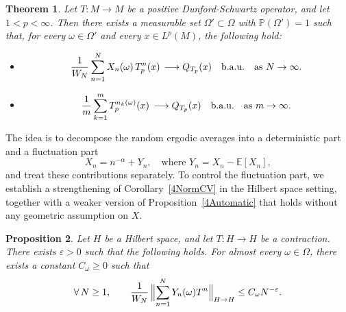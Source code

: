 \documentclass[12pt]{amsart}
\newcommand{\Pdb}{\mbox{$\mathbb{P}$}}
\newcommand{\Bignorm}[1]{\Bigl\Vert#1\Bigr\Vert}
\newtheorem{theorem}{Theorem}[section]
\newtheorem{proposition}[theorem]{Proposition}
\theoremstyle{remark}
\theoremstyle{definition}
\numberwithin{equation}{section}
\begin{document}
\begin{theorem}\label{5Main}
Let $T\colon M\to M$ be a positive Dunford-Schwartz operator, and let $1<p<\infty$.
Then there exists a measurable set $\Omega'\subset \Omega$ with $\Pdb(\Omega')=1$ such that, for every $\omega\in\Omega'$ and every $x\in L^p(M)$, the following hold:
\begin{itemize}
    \item[(1)]
    $$
    \frac{1}{W_N}\sum_{n=1}^N X_n(\omega)\, T_p^n(x)
    \,\longrightarrow Q_{T_p}(x)\quad\hbox{b.a.u.}
    \quad\hbox{as } N\to\infty.
    $$
    \item[(2)]
    $$
    \frac{1}{m}\sum_{k=1}^m T_p^{n_k(\omega)}(x)
    \,\longrightarrow Q_{T_p}(x)\quad\hbox{b.a.u.}
    \quad\hbox{as } m\to\infty.
    $$
\end{itemize}
\end{theorem}

The idea is to decompose the random ergodic averages into a deterministic part and a fluctuation part
\[
X_n = n^{-\alpha} + Y_n,
\quad \text{where } Y_n = X_n - \mathbb{E}[X_n],
\]
and treat these contributions separately. To control the fluctuation part, we establish a strengthening of Corollary~\ref{4NormCV} in the Hilbert space setting, together with a weaker version of Proposition~\ref{4Automatic} that holds without any geometric assumption on $X$. 

\begin{proposition}\label{5Hilbert}
Let $H$ be a Hilbert space, and let $T\colon H\to H$ be a contraction. 
There exists $\varepsilon>0$ such that the following holds.
For almost every $\omega\in \Omega$, there exists a constant
$C_\omega\geq 0$ such that 
\begin{equation}\label{Lac}
\forall\, N\geq 1,\qquad \frac{1}{W_{N}}\,
\Bignorm{\sum_{n=1}^N
Y_n(\omega) T^n}_{H\to H}\leq C_\omega N^{-\varepsilon}.
\end{equation}
\end{proposition}
\end{document}

